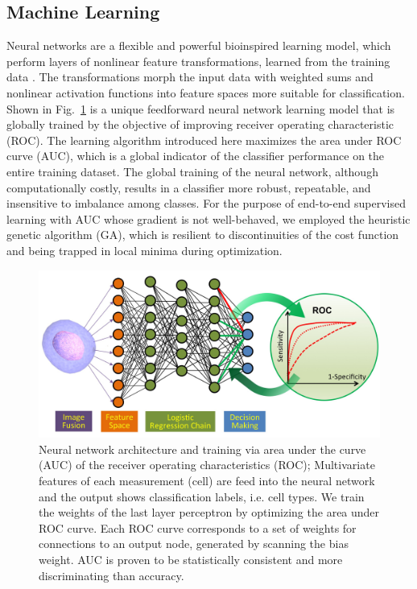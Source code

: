 \documentclass[aps,pra,reprint,longbibliography,superscriptaddress]{revtex4-1}
\begin{document}
\subsection{Machine Learning}

Neural networks are a flexible and powerful bioinspired learning model, which perform layers of nonlinear feature transformations, learned from the training data \cite{abu2012learning, bishop2006pattern, boddy1994neural}. The transformations morph the input data with weighted sums and nonlinear activation functions into feature spaces more suitable for classification. Shown in Fig.~\ref{fig:NeuralNet} is a unique feedforward neural network learning model that is globally trained by the objective of improving receiver operating characteristic (ROC). The learning algorithm introduced here maximizes the area under ROC curve (AUC), which is a global indicator of the classifier performance on the entire training dataset. The global training of the neural network, although computationally costly, results in a classifier more robust, repeatable, and insensitive to imbalance among classes. For the purpose of end-to-end supervised learning with AUC whose gradient is not well-behaved, we employed the heuristic genetic algorithm (GA), which is resilient to discontinuities of the cost function and being trapped in local minima during optimization.

\begin{figure}
\includegraphics[scale=0.2]{FigureNeuralNet.jpg}
\caption{\label{fig:NeuralNet} Neural network architecture and training via area under the curve (AUC) of the receiver operating characteristics (ROC); Multivariate features of each measurement (cell) are feed into the neural network and the output shows classification labels, i.e. cell types. We train the weights of the last layer perceptron by optimizing the area under ROC curve. Each ROC curve corresponds to a set of weights for connections to an output node, generated by scanning the bias weight. AUC is proven to be statistically consistent and more discriminating than accuracy.}
\end{figure}
\end{document}

